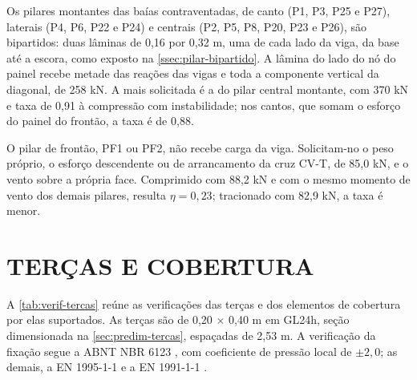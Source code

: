 Os pilares montantes das baías contraventadas, de canto (P1, P3, P25 e P27),
laterais (P4, P6, P22 e P24) e centrais (P2, P5, P8, P20, P23 e P26), são
bipartidos: duas lâminas de 0,16 por 0,32 m, uma de cada lado da viga, da base até
a escora, como exposto na \autoref{ssec:pilar-bipartido}. A lâmina do lado do nó
do painel recebe metade das reações das vigas e toda a componente vertical da
diagonal, de 258 kN. A mais solicitada é a do pilar central montante, com 370 kN
e taxa de 0,91 à compressão com instabilidade; nos cantos, que somam o esforço do
painel do frontão, a taxa é de 0,88.

O pilar de frontão, PF1 ou PF2, não recebe carga da viga. Solicitam-no o peso
próprio, o esforço descendente ou de arrancamento da cruz CV-T, de 85,0 kN, e o
vento sobre a própria face. Comprimido com 88,2 kN e com o mesmo momento de vento
dos demais pilares, resulta $\eta = 0{,}23$; tracionado com 82,9 kN, a taxa é
menor.

\section{TERÇAS E COBERTURA}\label{sec:verif-tercas}

A \autoref{tab:verif-tercas} reúne as verificações das terças e dos elementos de
cobertura por elas suportados. As terças são de 0,20 $\times$ 0,40 m em GL24h, seção dimensionada na \autoref{sec:predim-tercas},
espaçadas de 2,53 m. A verificação da fixação segue a
ABNT NBR 6123 \cite{NBR6123:2023}, com coeficiente de pressão local de
$\pm 2{,}0$; as demais, a EN 1995-1-1 \cite{EN1995-1-1:2004} e a
EN 1991-1-1 \cite{EN1991-1-1:2002}.


